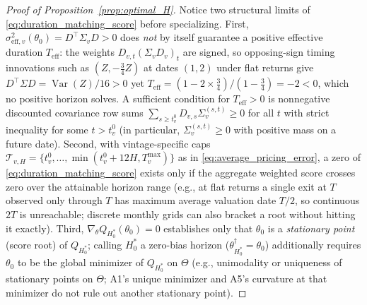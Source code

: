 \begin{proof}[Proof of Proposition~\ref{prop:optimal_H}]
Notice two structural limits of \eqref{eq:duration_matching_score} before specializing. First, $\sigma_{\mathrm{eff},v}^2(\theta_0) = D^\top \Sigma_v D > 0$ does \emph{not} by itself guarantee a positive effective duration $T_{\mathrm{eff}}$: the weights $D_{v,t}(\Sigma_v D_v)_t$ are signed, so opposing-sign timing innovations such as $(Z, -\frac{3}{4}Z)$ at dates $(1,2)$ under flat returns give $D^\top \Sigma D = \operatorname{Var}(Z)/16 > 0$ yet $T_{\mathrm{eff}} = (1 - 2\times \frac{3}{4})/(1 - \frac{3}{4}) = -2 < 0$, which no positive horizon solves. A sufficient condition for $T_{\mathrm{eff}} > 0$ is nonnegative discounted covariance row sums $\sum_{s \ge t_v^0} D_{v,s}\Sigma_v^{(s,t)} \ge 0$ for all $t$ with strict inequality for some $t > t_v^0$ (in particular, $\Sigma_v^{(s,t)} \ge 0$ with positive mass on a future date). Second, with vintage-specific caps $\mathcal{T}_{v,H} = \{t_v^0,\dots,\min(t_v^0+12H, T_v^{\max})\}$ as in \eqref{eq:average_pricing_error}, a zero of \eqref{eq:duration_matching_score} exists only if the aggregate weighted score crosses zero over the attainable horizon range (e.g., at flat returns a single exit at $T$ observed only through $T$ has maximum average valuation date $T/2$, so continuous $2T$ is unreachable; discrete monthly grids can also bracket a root without hitting it exactly). Third, $\nabla_\theta Q_{H_0^\ast}(\theta_0) = 0$ establishes only that $\theta_0$ is a \emph{stationary point} (score root) of $Q_{H_0^\ast}$; calling $H_0^\ast$ a zero-bias horizon ($\theta_{H_0^\ast}^\dagger = \theta_0$) additionally requires $\theta_0$ to be the global minimizer of $Q_{H_0^\ast}$ on $\Theta$ (e.g., unimodality or uniqueness of stationary points on $\Theta$; A1's unique minimizer and A5's curvature at that minimizer do not rule out another stationary point).


\end{proof}
